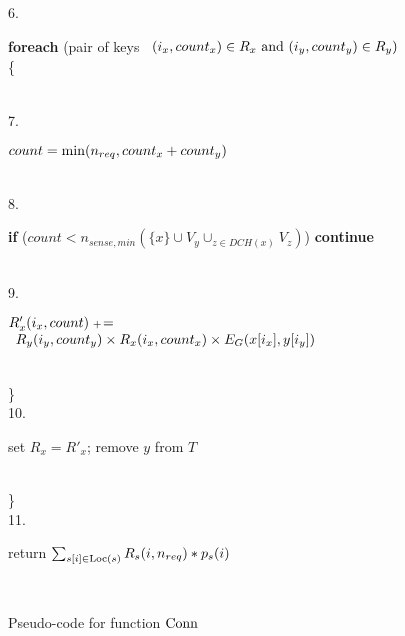 \begin{figure}[htbp]
\begin{center}
{\begin{minipage}[t]{6 in}
   6.   \begin{minipage}[t]{5in}
   		  {\bf foreach} (pair of keys
		       		$\begin{array}[t]{l}
				 (i_x, count_x) \in R_x \mbox { and }
		   		 (i_y, count_y) \in R_y)
				 \end{array}
				$ \\ 
		  \{
		  \end{minipage}
		  \\
   7.   \begin{minipage}[t]{5 in}
   		  $count= \min ({n_{req}}, count_x + count_y)$
		  \end{minipage}
		  \\
  8.   \begin{minipage}[t]{5 in}
   		  {\bf if} ($count < n_{sense,min}(\{x\}\cup V_y \cup_{z\in DCH(x)} V_z)$) {\bf continue} 
		  \end{minipage}
		  \\
   9.   \begin{minipage}[t]{5in}
   		  $R'_x (i_x,count) {\;{\scriptstyle +} \! =}$ 
		  	$\begin{array}[t]{l}
			 R_y(i_y,count_y) \times 
			 R_x(i_x,count_x) \times 
			 E_G(x[i_x], y[i_y])
		  	 \end{array}$
		  \end{minipage}
		  \\
        \} \\
   10.  \begin{minipage}[t]{5 in}
       		  set $R_x= R'_x$; remove $y$ from $T$
		   \end{minipage}
		   \\
        \} \\
   11. \begin{minipage}[t]{6 in}
       return $\sum_{s[i] \in {\mathrm {Loc}}(s)} R_s(i,{n_{req}}) * p_s(i)$
       \end{minipage}
       \\
    \end{minipage}	
}
\end{center}
    \normalsize
    \caption{Pseudo-code for function ${\mathrm {Conn}}$}
    \label{alg:Conn}
\vspace*{-0.1in}
    \end{figure}
